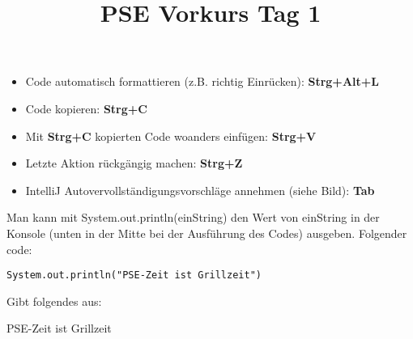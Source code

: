 \documentclass{../../sheet}
\title{PSE Vorkurs Tag 1}
\begin{document}
\maketitle

\begin{itemize}
    \item Code automatisch formattieren (z.B. richtig Einrücken): \textbf{Strg+Alt+L}
    \item Code kopieren: \textbf{Strg+C}
    \item Mit \textbf{Strg+C} kopierten Code woanders einfügen: \textbf{Strg+V}
    \item Letzte Aktion rückgängig machen: \textbf{Strg+Z}
    \item IntelliJ Autovervollständigungsvorschläge annehmen (siehe Bild): \textbf{Tab}
\end{itemize}
\newpage


Man kann mit System.out.println(einString) den Wert von einString in der Konsole (unten in der Mitte bei der Ausführung des Codes) ausgeben. Folgender code:
\begin{verbatim}
System.out.println("PSE-Zeit ist Grillzeit")
\end{verbatim}
Gibt folgendes aus:
\begin{ausgabe}
    PSE-Zeit ist Grillzeit
\end{ausgabe}
\end{document}
